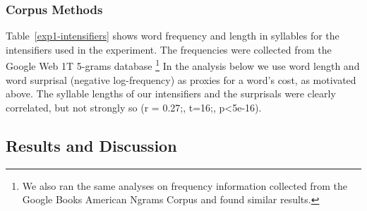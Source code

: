 \documentclass[10pt,letterpaper]{article}
\newcommand{\todo}[1]{{\color{red}#1}}
\begin{document}

\subsubsection{Corpus Methods}

Table~\ref{exp1-intensifiers} shows word frequency and length in syllables for the intensifiers used in the experiment.
The frequencies were collected from the Google Web 1T 5-grams database \cite{web1t5gram}\footnote{
We also ran the same analyses on frequency information collected from the Google Books American Ngrams Corpus \cite{books2011} and found similar results.
}
In the analysis below we use word length and word surprisal (negative log-frequency) as proxies for a word's cost, as motivated above.
The syllable lengths of our intensifiers and the surprisals %
were clearly correlated, but not strongly so (r = 0.27;, t=16;, p<5e-16).

\subsection{Results and Discussion}
\end{document}
